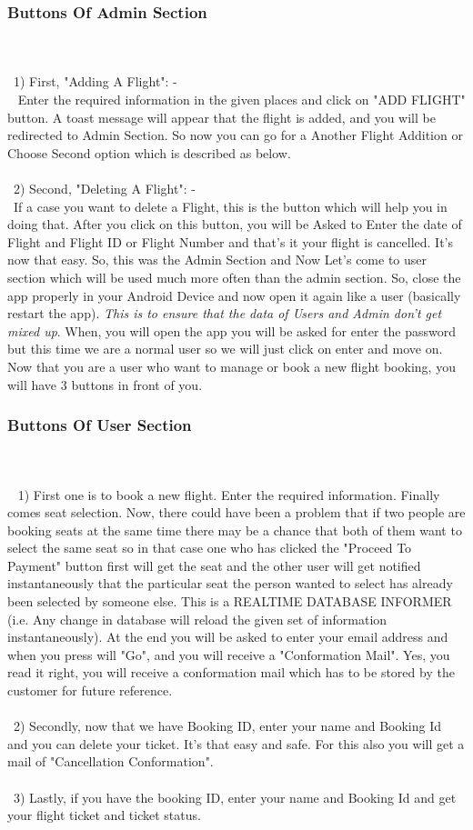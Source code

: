 \documentclass[8pt]{beamer}
\begin{document}
\begin{frame}
\frametitle{Buttons Of Admin Section}
\\~\\~1) First, "Adding A Flight": -\\~
Enter the required information in the given places and click on "ADD FLIGHT" button. A toast message will appear that the flight is added, and you will be redirected to Admin Section. So now you can go for a Another Flight Addition or Choose Second option which is described as below.
\\~\\~2) Second, "Deleting A Flight": -
\\~If a case you want to delete a Flight, this is the button which will help you in doing that. After you click on this button, you will be Asked to Enter the date of Flight and Flight ID or Flight Number and that's it your flight is cancelled. It's now that easy. So, this was the Admin Section and Now Let's come to user section which will be used much more often than the admin section. So, close the app properly in your Android Device and now open it again like a user (basically restart the app). \textit{This is to ensure that the data of Users and Admin don't get mixed up}. When, you will open the app you will be asked for enter the password but this time we are a normal user so we will just click on enter and move on. Now that you are a user who want to manage or book a new flight booking, you will have 3 buttons in front of you.\end{frame}

\begin{frame}
\frametitle{Buttons Of User Section}
\\~\\~
1) First one is to book a new flight. Enter the required information. Finally comes seat selection. Now, there could have been a problem that if two people are booking seats at the same time there may be a chance that both of them want to select the same seat so in that case one who has clicked the "Proceed To Payment" button first will get the seat and the other user will get notified instantaneously that the particular seat the person wanted to select has already been selected by someone else. This is a REALTIME DATABASE INFORMER (i.e. Any change in database will reload the given set of information instantaneously). At the end you will be asked to enter your email address and when you press will "Go", and you will receive a "Conformation Mail". Yes, you read it right, you will receive a conformation mail
which has to be stored by the customer for future reference.
\\~\\~2) Secondly, now that we have Booking ID, enter your name and Booking Id and you can delete your ticket. It's that easy and safe. For this also you will get a mail of "Cancellation Conformation".
\\~\\~3) Lastly, if you have the booking ID, enter your name and Booking Id and get your flight ticket and ticket status.
\end{frame}
\end{document}
